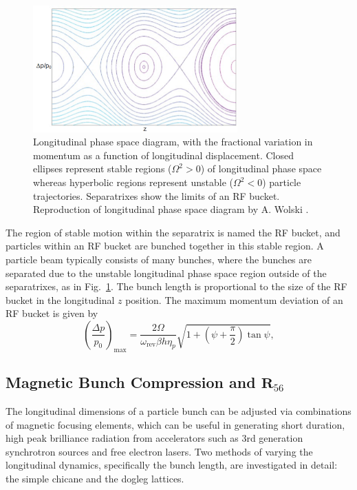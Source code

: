 \documentclass[../main.tex]{subfiles}
\begin{document}
\begin{figure}[!h]
\centering
\includegraphics[width=0.7\textwidth]{Figures/Energy_Recovery_Linac_Design/Longitudinal_Dynamics_fixed.pdf}
\caption{Longitudinal phase space diagram, with the fractional variation in momentum as a function of longitudinal displacement. Closed ellipses represent stable regions ($\Omega^{2}>0$) of longitudinal phase space whereas hyperbolic regions represent unstable ($\Omega^{2}<0$) particle trajectories. Separatrixes show the limits of an RF bucket. Reproduction of longitudinal phase space diagram by A. Wolski \cite{wolski2012longitudinal}.}
\label{fig:longitudinal_dynamics}
\end{figure}

The region of stable motion within the separatrix is named the RF bucket, and particles within an RF bucket are bunched together in this stable region. A particle beam typically consists of many bunches, where the bunches are separated due to the unstable longitudinal phase space region outside of the separatrixes, as in Fig.~\ref{fig:longitudinal_dynamics}. The bunch length is proportional to the size of the RF bucket in the longitudinal $z$ position. The maximum momentum deviation of an RF bucket is given by \cite{wolski2012longitudinal}
\begin{equation}
\left(\frac{\Delta p}{p_{0}}\right)_{\mathrm{max}} = \frac{2\Omega}{\omega_{\mathrm{rev}}\beta h\eta_{p}}\sqrt{1+\left(\psi+\frac{\pi}{2}\right)\tan\psi},
\label{eq:RF_bucket_momentum_deviation}    
\end{equation}

\subsection{Magnetic Bunch Compression and $\boldsymbol{R}_{56}$}
\label{sec:magnetic_bunch_compression}

The longitudinal dimensions of a particle bunch can be adjusted via combinations of magnetic focusing elements, which can be useful in generating short duration, high peak brilliance radiation from accelerators such as 3rd generation synchrotron sources and free electron lasers. Two methods of varying the longitudinal dynamics, specifically the bunch length, are investigated in detail: the simple chicane and the dogleg lattices.
\end{document}

